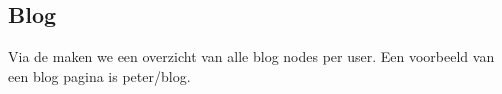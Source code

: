 \subsection{Blog}\label{blog}

Via de  maken we een overzicht van alle blog nodes per user. Een voorbeeld van een blog pagina is peter/blog.
